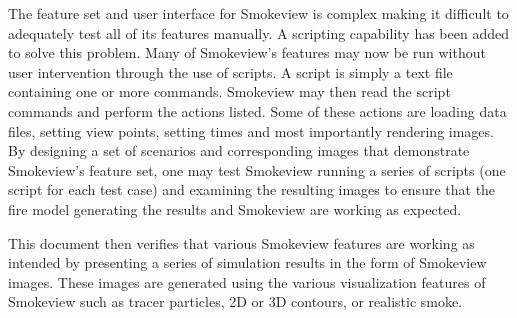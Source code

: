 The feature set and user interface for Smokeview is complex making it difficult to adequately test all of its features manually.  A scripting capability has been added to solve this problem. Many of Smokeview's features may now be run without user intervention through the use of scripts.  A script is simply a text file containing one or more commands.  Smokeview may then read the script commands and perform the actions listed. Some of these actions are loading data files, setting view points, setting times and most importantly rendering images.  By designing a set of scenarios and corresponding images that demonstrate Smokeview's feature set, one may test Smokeview running a series of scripts (one script for each test case)  and examining the resulting images to ensure that the fire model generating the results and Smokeview are working as expected.

This document then verifies that various Smokeview features are working as intended by presenting a series of   simulation results in the form of Smokeview images.  These images are generated using the various visualization features of Smokeview such as tracer particles, 2D or 3D contours, or realistic smoke.
